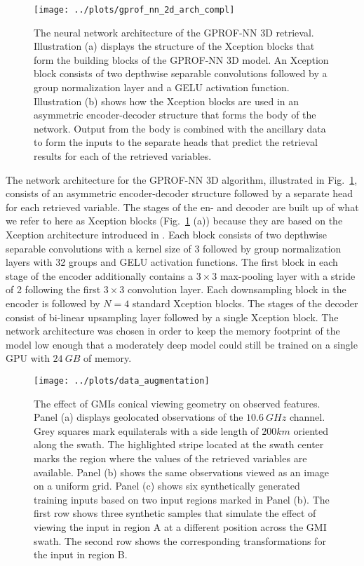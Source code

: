 \documentclass[a4paper,11pt,bibtotoc]{scrartcl}
\begin{document}
\begin{figure}[hbpt]
  \centering
  \texttt{[image: ../plots/gprof\_nn\_2d\_arch\_compl]}
  \caption{
    The neural network architecture of the GPROF-NN 3D retrieval. Illustration
    (a) displays the structure of the Xception blocks \citep{chollet17} that
    form the building blocks of the GPROF-NN 3D model. An Xception block
    consists of two depthwise separable convolutions followed by a group
    normalization layer and a GELU activation function. Illustration (b) shows
    how the Xception blocks are used in an asymmetric encoder-decoder structure
    that forms the body of the network. Output from the body is combined with
    the ancillary data to form the inputs to the separate heads that predict the
    retrieval results for each of the retrieved variables.
  }
  \label{fig:gprof_nn_3d_arch}
\end{figure}

The network architecture for the GPROF-NN 3D algorithm, illustrated in
Fig.~\ref{fig:gprof_nn_3d_arch}, consists of an asymmetric encoder-decoder
structure followed by a separate head for each retrieved variable. The stages of
the en- and decoder are built up of what we refer to here as Xception blocks
(Fig.~\ref{fig:gprof_nn_3d_arch} (a)) because they are based on the Xception
architecture introduced in \citet{chollet17}. Each block consists of two
depthwise separable convolutions with a kernel size of 3 followed by group
normalization layers with 32 groups and GELU activation functions. The first
block in each stage of the encoder additionally contains a $3\times3$
max-pooling layer with a stride of 2 following the first $3\times3$ convolution
layer. Each downsampling block in the encoder is followed by $N = 4$ standard
Xception blocks. The stages of the decoder consist of bi-linear upsampling layer
followed by a single Xception block. The network architecture was chosen in
order to keep the memory footprint of the model low enough that a moderately
deep model could still be trained on a single GPU with $24\ \unit{GB}$ of
memory.


\begin{figure}[hbpt]
  \centering
    \texttt{[image: ../plots/data\_augmentation]}
    \caption{
      The effect of GMIs conical viewing geometry on observed features. Panel
      (a) displays geolocated observations of the $10.6\ \unit{GHz}$ channel.
      Grey squares mark equilaterals with a side length of $200\unit{km}$
      oriented along the swath. The highlighted stripe located at the swath
      center marks the region where the values of the retrieved variables are
      available. Panel (b) shows the same observations viewed as an image on a
      uniform grid. Panel (c) shows six synthetically generated training inputs
      based on two input regions marked in Panel (b). The first row shows three
      synthetic samples that simulate the effect of viewing the input in region
      A at a different position across the GMI swath. The second row shows the
      corresponding transformations for the input in region B.
    }
  \label{fig:data_augmentation}
\end{figure}
\end{document}
